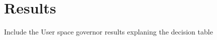 \section{Results}\label{sec:results}

Include the User space governor results explaning the decision table 
